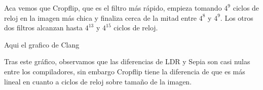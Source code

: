 Aca vemos que Cropflip, que es el filtro más rápido, empieza tomando $4^9$ ciclos de reloj en la imagen más chica y finaliza cerca de la mitad entre $4^8$ y $4^9$.
Los otros dos filtros alcanzan hasta $4^13$ y $4^15$ ciclos de reloj.

Aqui el grafico de Clang

\begin{figure}[H]
    \centering
    \begin{floatrow}
    \end{floatrow}
\end{figure}

Tras este gráfico, observamos que las diferencias de LDR y Sepia son casi nulas entre los compiladores, sin embargo Cropflip tiene la diferencia de que es más
lineal en cuanto a ciclos de reloj sobre tamaño de la imagen.


